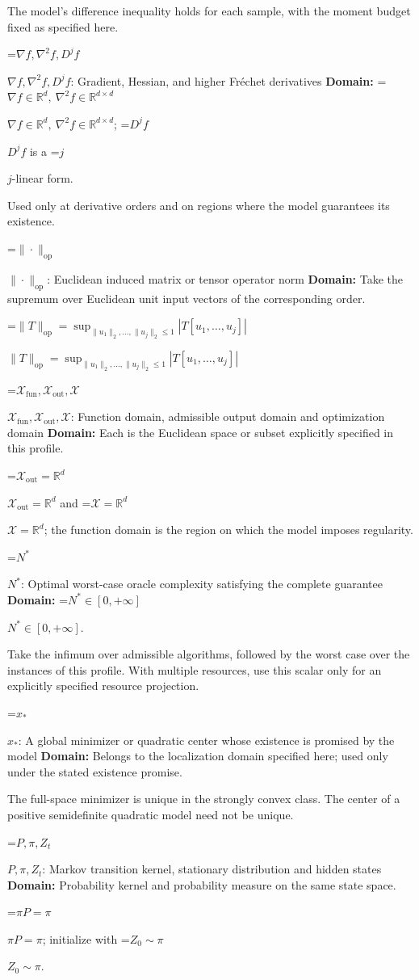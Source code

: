 \documentclass[10pt,a4paper]{article}
\newcommand{\AtlasMath}[1]{\par\begingroup\centering\setbox0=\hbox{$\displaystyle #1$}\ifdim\wd0>1.4\linewidth\typeout{ATLAS WIDE FORMULA: \the\wd0}\fi\ifdim\wd0>\linewidth\resizebox{\linewidth}{!}{\box0}\else\box0\fi\par\endgroup}
\newcommand{\AtlasInlineMath}[1]{\begingroup\setbox0=\hbox{$#1$}\ifdim\wd0>.4\linewidth\endgroup\AtlasMath{#1}\else\endgroup$#1$\fi}
\begin{document}
The model's difference inequality holds for each sample, with the moment budget fixed as specified here.

\AtlasInlineMath{\nabla f,\nabla^2f,D^jf}: Gradient, Hessian, and higher Fréchet derivatives \textbf{Domain:} \AtlasInlineMath{\nabla f\in\mathbb{R}^d,\ \nabla^2f\in\mathbb{R}^{d\times d}}; \AtlasInlineMath{D^jf} is a \AtlasInlineMath{j}-linear form.

Used only at derivative orders and on regions where the model guarantees its existence.

\AtlasInlineMath{\|\cdot\|_{\mathrm{op}}}: Euclidean induced matrix or tensor operator norm \textbf{Domain:} Take the supremum over Euclidean unit input vectors of the corresponding order.

\AtlasInlineMath{\|T\|_{\mathrm{op}}=\sup_{\|u_1\|_2,\ldots,\|u_j\|_2\le1}|T[u_1,\ldots,u_j]|}

\AtlasInlineMath{\mathcal{X}_{\mathrm{fun}},\mathcal{X}_{\mathrm{out}},\mathcal{X}}: Function domain, admissible output domain and optimization domain \textbf{Domain:} Each is the Euclidean space or subset explicitly specified in this profile.

\AtlasInlineMath{\mathcal{X}_{\mathrm{out}}=\mathbb{R}^d} and \AtlasInlineMath{\mathcal{X}=\mathbb{R}^d}; the function domain is the region on which the model imposes regularity.

\AtlasInlineMath{N^*}: Optimal worst-case oracle complexity satisfying the complete guarantee \textbf{Domain:} \AtlasInlineMath{N^*\in[0,+\infty]}.

Take the infimum over admissible algorithms, followed by the worst case over the instances of this profile. With multiple resources, use this scalar only for an explicitly specified resource projection.

\AtlasInlineMath{x_*}: A global minimizer or quadratic center whose existence is promised by the model \textbf{Domain:} Belongs to the localization domain specified here; used only under the stated existence promise.

The full-space minimizer is unique in the strongly convex class. The center of a positive semidefinite quadratic model need not be unique.

\AtlasInlineMath{P,\pi,Z_t}: Markov transition kernel, stationary distribution and hidden states \textbf{Domain:} Probability kernel and probability measure on the same state space.

\AtlasInlineMath{\pi P=\pi}; initialize with \AtlasInlineMath{Z_0\sim\pi}.
\end{document}
